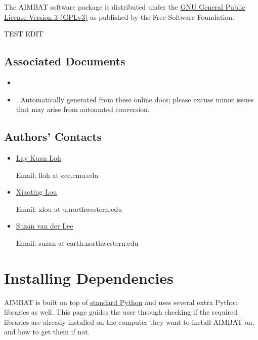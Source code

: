 \documentclass[letterpaper,10pt,english]{sphinxmanual}
\begin{document}
The AIMBAT software package is distributed under the \href{http://www.gnu.org/licenses/gpl.html}{GNU General Public License Version 3 (GPLv3)} as published by the Free Software Foundation.

TEST EDIT


\section{Associated Documents}
\label{docfiles/introduction:associated-documents}\begin{itemize}
\item {} 

\item {} 
. Automatically generated from these online docs; please excuse minor issues that may arise from automated conversion.

\end{itemize}


\section{Authors' Contacts}
\label{docfiles/introduction:authors-contacts}\label{docfiles/introduction:id5}\begin{itemize}
\item {} 
\href{http://lkloh2410.wordpress.com/}{Lay Kuan Loh}

Email: lloh at ece.cmu.edu

\item {} 
\href{http://www.earth.northwestern.edu/~xlou/Welcome.html}{Xiaoting Lou}

Email: xlou at u.northwestern.edu

\item {} 
\href{http://www.earth.northwestern.edu/research/suzan/}{Suzan van der Lee}

Email: suzan at earth.northwestern.edu

\end{itemize}


\chapter{Installing Dependencies}
\label{docfiles/install_dependencies:installing-dependencies}\label{docfiles/install_dependencies::doc}
AIMBAT is built on top of \href{https://www.python.org/}{standard Python} and uses several extra Python libraries as well. This page guides the user through checking if the required libraries are already installed on the computer they want to install AIMBAT on, and how to get them if not.
\end{document}
